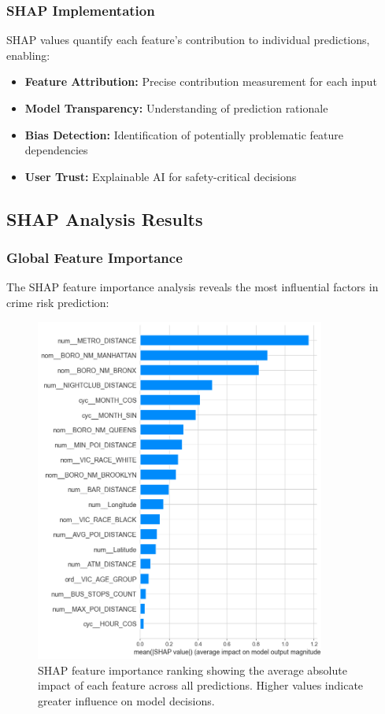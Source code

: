 \documentclass[11pt]{article}
\begin{document}
\subsubsection{SHAP Implementation}
SHAP values quantify each feature's contribution to individual predictions, enabling:
\begin{itemize}[leftmargin=*]
\item \textbf{Feature Attribution:} Precise contribution measurement for each input
\item \textbf{Model Transparency:} Understanding of prediction rationale
\item \textbf{Bias Detection:} Identification of potentially problematic feature dependencies
\item \textbf{User Trust:} Explainable AI for safety-critical decisions
\end{itemize}

\subsection{SHAP Analysis Results}

\subsubsection{Global Feature Importance}
The SHAP feature importance analysis reveals the most influential factors in crime risk prediction:

\begin{figure}[H]
\centering
\includegraphics[width=0.85\textwidth]{LogisticRegression_shap_feature_importance.png}
\caption{SHAP feature importance ranking showing the average absolute impact of each feature across all predictions. Higher values indicate greater influence on model decisions.}
\label{fig:shap_importance}
\end{figure}
\end{document}
